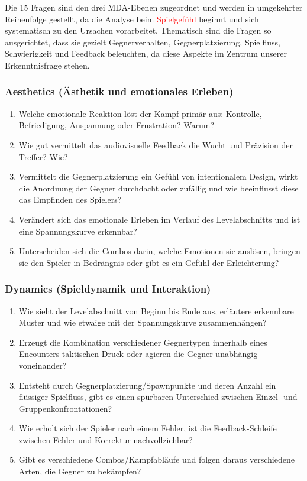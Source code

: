 \documentclass[../Main.tex]{subfiles}
\begin{document}
Die 15 Fragen sind den drei MDA-Ebenen zugeordnet und werden in umgekehrter Reihenfolge gestellt, da die Analyse beim \textcolor{red}{Spielgefühl} beginnt und sich systematisch zu den Ursachen vorarbeitet. Thematisch sind die Fragen so ausgerichtet, dass sie gezielt Gegnerverhalten, Gegnerplatzierung, Spielfluss, Schwierigkeit und Feedback beleuchten, da diese Aspekte im Zentrum unserer Erkenntnisfrage stehen.

\subsubsection{Aesthetics (Ästhetik und emotionales Erleben)}

\begin{enumerate}[label=\textbf{A\arabic*}, leftmargin=1.5cm, itemsep=0.5em]
    \item Welche emotionale Reaktion löst der Kampf primär aus: Kontrolle, Befriedigung, Anspannung oder Frustration? Warum?
    \item Wie gut vermittelt das audiovisuelle Feedback die Wucht und Präzision der Treffer? Wie?
    \item Vermittelt die Gegnerplatzierung ein Gefühl von intentionalem Design, wirkt die Anordnung der Gegner durchdacht oder zufällig und wie beeinflusst diese das Empfinden des Spielers?
    \item Verändert sich das emotionale Erleben im Verlauf des Levelabschnitts und ist eine Spannungskurve erkennbar?
    \item Unterscheiden sich die Combos darin, welche Emotionen sie auslösen, bringen sie den Spieler in Bedrängnis oder gibt es ein Gefühl der Erleichterung?
\end{enumerate}

\subsubsection{Dynamics (Spieldynamik und Interaktion)}

\begin{enumerate}[label=\textbf{D\arabic*}, leftmargin=1.5cm, itemsep=0.5em]
    \item Wie sieht der Levelabschnitt von Beginn bis Ende aus, erläutere erkennbare Muster und wie etwaige mit der Spannungskurve zusammenhängen?
    \item Erzeugt die Kombination verschiedener Gegnertypen innerhalb eines Encounters taktischen Druck oder agieren die Gegner unabhängig voneinander?
    \item Entsteht durch Gegnerplatzierung/Spawnpunkte und deren Anzahl ein flüssiger Spielfluss, gibt es einen spürbaren Unterschied zwischen Einzel- und Gruppenkonfrontationen?
    \item Wie erholt sich der Spieler nach einem Fehler, ist die Feedback-Schleife zwischen Fehler und Korrektur nachvollziehbar?
    \item Gibt es verschiedene Combos/Kampfabläufe und folgen daraus verschiedene Arten, die Gegner zu bekämpfen?
\end{enumerate}
\end{document}
